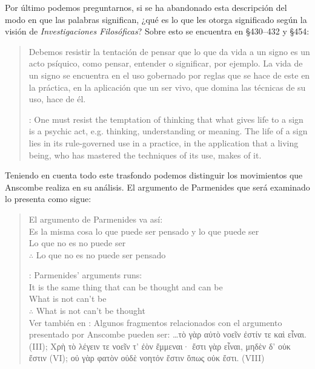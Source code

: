 Por último podemos preguntarnos, si se ha abandonado esta descripción del modo en que las palabras significan, ¿qué es lo que les otorga significado según la visión de \emph{Investigaciones Filosóficas}? Sobre esto se encuentra en \S430--432 y \S454: \blockquote[{\cite[4]{hacker2000mind}}: One must resist the temptation of thinking that what gives life to a sign is a psychic act, e.g. thinking, understanding or meaning. The life of a sign lies in its rule-governed use in a practice, in the application that a living being, who has mastered the techniques of its use, makes of it.]{Debemos resistir la tentación de pensar que lo que da vida a un signo es un acto psíquico, como pensar, entender o significar, por ejemplo. La vida de un signo se encuentra en el uso gobernado por reglas que se hace de este en la práctica, en la aplicación que un ser vivo, que domina las técnicas de su uso, hace de él.}

Teniendo en cuenta todo este trasfondo podemos distinguir los movimientos que Anscombe realiza en su análisis. El argumento de Parmenides que será examinado lo presenta como sigue: \blockquote[{\cite[3]{anscombe1981parmenides:pmc}}: Parmenides' arguments runs:\\
It is the same thing that can be thought and can be\\
What is not can't be\\
$\therefore$ What is not can't be thought\\
Ver también en {\cite[22--25]{parmenides2007poema}}: Algunos fragmentos relacionados con el argumento presentado por Anscombe pueden ser: \ldots\textgreek{τὸ γὰρ αὐτὸ νοεῖν ἐστίν τε καὶ εἶναι.} (III); \textgreek{Χρὴ τὸ λέγειν τε νοεῖν τ' ἐὸν ἔμμεναι· ἔστι γὰρ εἶναι, μηδὲν δ' οὐκ ἔστιν} (VI); \textelp{} \textgreek{οὐ γὰρ φατὸν οὐδὲ νοητόν ἔστιν ὅπως οὐκ ἔστι.} (VIII)]{El argumento de Parmenides va así:\\
Es la misma cosa lo que puede ser pensado y lo que puede ser\\
Lo que no es no puede ser\\
$\therefore$ Lo que no es no puede ser pensado}

